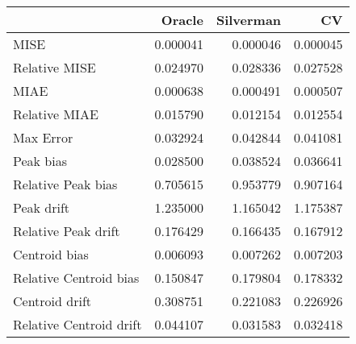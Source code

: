\begin{tabular}{lrrr}
  \hline
 & Oracle & Silverman & CV \\ 
  \hline
MISE & 0.000041 & 0.000046 & 0.000045 \\ 
  Relative MISE & 0.024970 & 0.028336 & 0.027528 \\ 
  MIAE & 0.000638 & 0.000491 & 0.000507 \\ 
  Relative MIAE & 0.015790 & 0.012154 & 0.012554 \\ 
  Max Error & 0.032924 & 0.042844 & 0.041081 \\ 
  Peak bias & 0.028500 & 0.038524 & 0.036641 \\ 
  Relative Peak bias & 0.705615 & 0.953779 & 0.907164 \\ 
  Peak drift & 1.235000 & 1.165042 & 1.175387 \\ 
  Relative Peak drift & 0.176429 & 0.166435 & 0.167912 \\ 
  Centroid bias & 0.006093 & 0.007262 & 0.007203 \\ 
  Relative Centroid bias & 0.150847 & 0.179804 & 0.178332 \\ 
  Centroid drift & 0.308751 & 0.221083 & 0.226926 \\ 
  Relative Centroid drift & 0.044107 & 0.031583 & 0.032418 \\ 
   \hline
\end{tabular}
